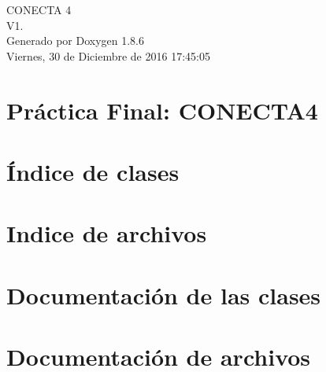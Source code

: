 \documentclass[twoside]{article}
\begin{document}
\hypersetup{pageanchor=false}
\begin{titlepage}
\vspace*{7cm}
\begin{center}%
{\Large C\-O\-N\-E\-C\-T\-A 4 \\[1ex]\large V1. }\\
\vspace*{1cm}
{\large Generado por Doxygen 1.8.6}\\
\vspace*{0.5cm}
{\small Viernes, 30 de Diciembre de 2016 17:45:05}\\
\end{center}
\end{titlepage}
\tableofcontents
{}
\hypersetup{pageanchor=true}

\section{Práctica Final\-: C\-O\-N\-E\-C\-T\-A4}
\label{index}\hypertarget{index}{}
\section{Índice de clases}

\section{Indice de archivos}

\section{Documentación de las clases}









\section{Documentación de archivos}






\newpage
{}
{}
\printindex
\end{document}
